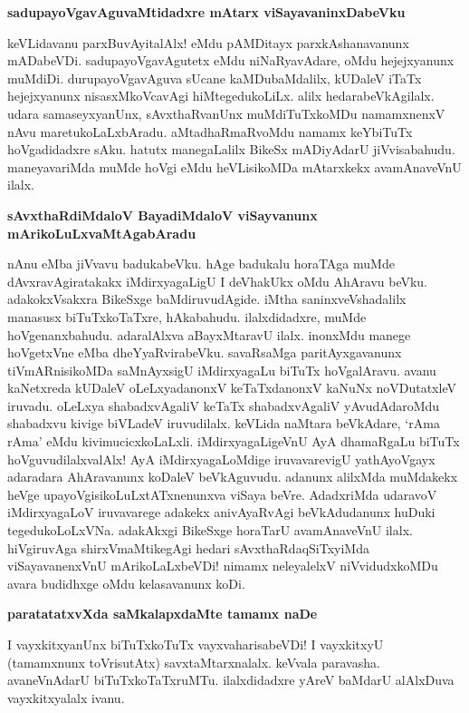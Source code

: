 {\bigskip
\noindent
{\large\bf sadupayoVgavAguvaMtidadxre mAtarx viSayavaninxDabeVku}}\label{page252}
\medskip

\noindent
keVLidavanu parxBuvAyitalAlx! eMdu pAMDitayx parxkAshanavanunx mADabeVDi. sadupayoVgavAgutetx eMdu niNaRyavAdare, oMdu hejejxyanunx muMdiDi. durupayoVgavAguva sUcane kaMDu\-baMdalilx, kUDaleV iTaTx hejejxyanunx nisasxMkoVcavAgi hiMtegedukoLiLx. alilx hedarabeVkAgilalx. udara samaseyx\-yanUnx, sAvxthaRvanUnx muMdiTuTxkoMDu namamxnenxV nAvu maretukoLaLxbAradu. aMtadhaRmaRvoMdu namamx keYbiTuTx hoVgadidadxre sAku. hatutx manegaLalilx BikeSx mADiyAdarU jiVvisabahudu. maneyava\-riMda muMde hoVgi eMdu heVLisikoMDa mAtarxkekx avamAnaveVnU ilalx.

{\bigskip
\noindent
{\large\bf sAvxthaRdiMdaloV BayadiMdaloV viSayvanunx mArikoLuLxvaMtAga\break\-bAradu}}\label{page252}
\medskip

\noindent
nAnu eMba jiVvavu badukabeVku. hAge badukalu horaTAga muMde dAvxravAgiratakakx iMdirxya\-gaLigU I deVhakUkx oMdu AhAravu beVku. adakokxVsakxra BikeSxge baMdiruvudAgide. iMtha saninx\-veVshadalilx manasusx biTuTxkoTaTxre, hAkabahudu. ilalxdidadxre, muMde hoVgenanxbahudu. adaralAlxva aBayxMtaravU\- ilalx. inonxMdu manege hoVgetxVne eMba dheYyaRvirabeVku. savaRsaMga paritAyxga\-vanunx tiVmAR\-nisi\-koMDa saMnAyxsigU iMdirxyagaLu biTuTx hoVgalAravu. avanu kaNetxreda kUDaleV oLeLxyadanonxV keTaTx\-danonxV kaNuNx noVDutatxleV iruvadu. oLeLxya shabadxvAgaliV keTaTx shabadxvAgaliV yAvudAdaroMdu shabadxvu kivige biVLadeV iruvudilalx. keVLida naMtara beVkAdare, `rAma rAma' eMdu kivimucicxkoLaLxli. iMdirxyagaLigeVnU AyA dhamaRgaLu biTuTx hoVguvudilalxvalAlx! AyA iMdirxyagaLoMdige iruva\-varevigU yathAyoVgayx adaradara AhAravanunx koDaleV beVkAguvudu. adanunx alilxMda muMdakekx heVge upayoVgisikoLuLxtATxnenunxva viSaya beVre. AdadxriMda udaravoV iMdirxyagaLoV iruvavarege adakekx anivAyaRvAgi beVkAdudanunx huDuki tegedukoLoLxVNa. adakAkxgi BikeSxge horaTarU ava\-mAna\-veVnU ilalx. hiVgiruvAga shirxVmaMtikegAgi hedari sAvxthaRdaqSiTxyiMda viSayavanenxVnU mArikoLaLxbeVDi! nimamx neleyalelxV niVvidudxkoMDu avara budidhxge oMdu kelasavanunx koDi.

{\bigskip
\noindent
{\large\bf paratatatxvXda saMkalapxdaMte tamamx naDe}}\label{page253}
\medskip

\noindent
I vayxkitxyanUnx biTuTxkoTuTx vayxvaharisabeVDi! I vayxkitxyU (tamamxnunx toVrisutAtx) savxtaMtarx\-nalalx. keVvala paravasha. avaneVnAdarU biTuTxkoTaTxruMTu. ilalxdidadxre yAreV baMdarU alAlxDuva vayxkitx\-yalalx ivanu.

